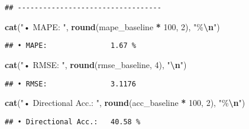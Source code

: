 \documentclass[
]{article}
\newenvironment{Shaded}{\begin{snugshade}}{\end{snugshade}}
\newcommand{\DecValTok}[1]{\textcolor[rgb]{0.00,0.00,0.81}{#1}}
\newcommand{\FunctionTok}[1]{\textcolor[rgb]{0.13,0.29,0.53}{\textbf{#1}}}
\newcommand{\NormalTok}[1]{#1}
\newcommand{\SpecialCharTok}[1]{\textcolor[rgb]{0.81,0.36,0.00}{\textbf{#1}}}
\newcommand{\StringTok}[1]{\textcolor[rgb]{0.31,0.60,0.02}{#1}}
\begin{document}
\begin{verbatim}
## ----------------------------------
\end{verbatim}

\begin{Shaded}
\begin{Highlighting}[]
\FunctionTok{cat}\NormalTok{(}\StringTok{"• MAPE:              "}\NormalTok{, }\FunctionTok{round}\NormalTok{(mape\_baseline }\SpecialCharTok{*} \DecValTok{100}\NormalTok{, }\DecValTok{2}\NormalTok{), }\StringTok{"\%}\SpecialCharTok{\textbackslash{}n}\StringTok{"}\NormalTok{)}
\end{Highlighting}
\end{Shaded}

\begin{verbatim}
## • MAPE:               1.67 %
\end{verbatim}

\begin{Shaded}
\begin{Highlighting}[]
\FunctionTok{cat}\NormalTok{(}\StringTok{"• RMSE:              "}\NormalTok{, }\FunctionTok{round}\NormalTok{(rmse\_baseline, }\DecValTok{4}\NormalTok{), }\StringTok{"}\SpecialCharTok{\textbackslash{}n}\StringTok{"}\NormalTok{)}
\end{Highlighting}
\end{Shaded}

\begin{verbatim}
## • RMSE:               3.1176
\end{verbatim}

\begin{Shaded}
\begin{Highlighting}[]
\FunctionTok{cat}\NormalTok{(}\StringTok{"• Directional Acc.:  "}\NormalTok{, }\FunctionTok{round}\NormalTok{(acc\_baseline }\SpecialCharTok{*} \DecValTok{100}\NormalTok{, }\DecValTok{2}\NormalTok{), }\StringTok{"\%}\SpecialCharTok{\textbackslash{}n}\StringTok{"}\NormalTok{)}
\end{Highlighting}
\end{Shaded}

\begin{verbatim}
## • Directional Acc.:   40.58 %
\end{verbatim}

\begin{Shaded}
\end{Shaded}
\end{document}
